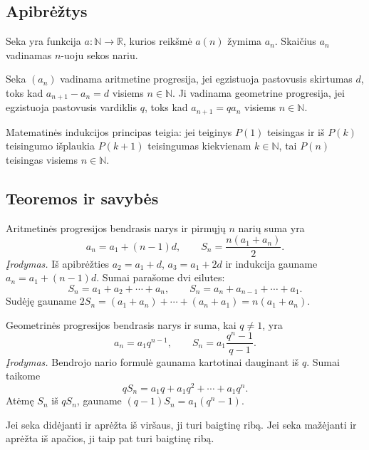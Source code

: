 \subsection{Apibrėžtys}

\begin{apibreztis}
Seka yra funkcija $a:\mathbb{N}\to \mathbb{R}$, kurios reikšmė $a(n)$ žymima $a_n$. Skaičius $a_n$ vadinamas $n$-uoju sekos nariu.
\end{apibreztis}

\begin{apibreztis}
Seka $(a_n)$ vadinama aritmetine progresija, jei egzistuoja pastovusis skirtumas $d$, toks kad $a_{n+1}-a_n=d$ visiems $n\in\mathbb{N}$. Ji vadinama geometrine progresija, jei egzistuoja pastovusis vardiklis $q$, toks kad $a_{n+1}=qa_n$ visiems $n\in\mathbb{N}$.
\end{apibreztis}

\begin{apibreztis}
Matematinės indukcijos principas teigia: jei teiginys $P(1)$ teisingas ir iš $P(k)$ teisingumo išplaukia $P(k+1)$ teisingumas kiekvienam $k\in\mathbb{N}$, tai $P(n)$ teisingas visiems $n\in\mathbb{N}$.
\end{apibreztis}

\subsection{Teoremos ir savybės}

\begin{teorema}
Aritmetinės progresijos bendrasis narys ir pirmųjų $n$ narių suma yra
\[
a_n=a_1+(n-1)d,\qquad S_n=\frac{n(a_1+a_n)}{2}.
\]
\emph{Įrodymas.} Iš apibrėžties $a_2=a_1+d$, $a_3=a_1+2d$ ir indukcija gauname $a_n=a_1+(n-1)d$. Sumai parašome dvi eilutes:
\[
S_n=a_1+a_2+\cdots+a_n,\qquad S_n=a_n+a_{n-1}+\cdots+a_1.
\]
Sudėję gauname $2S_n=(a_1+a_n)+\cdots+(a_n+a_1)=n(a_1+a_n)$.
\end{teorema}

\begin{teorema}
Geometrinės progresijos bendrasis narys ir suma, kai $q\ne 1$, yra
\[
a_n=a_1q^{n-1},\qquad S_n=a_1\frac{q^n-1}{q-1}.
\]
\emph{Įrodymas.} Bendrojo nario formulė gaunama kartotinai dauginant iš $q$. Sumai taikome
\[
qS_n=a_1q+a_1q^2+\cdots+a_1q^n.
\]
Atėmę $S_n$ iš $qS_n$, gauname $(q-1)S_n=a_1(q^n-1)$.
\end{teorema}

\begin{savybe}
Jei seka didėjanti ir aprėžta iš viršaus, ji turi baigtinę ribą. Jei seka mažėjanti ir aprėžta iš apačios, ji taip pat turi baigtinę ribą.
\end{savybe}


